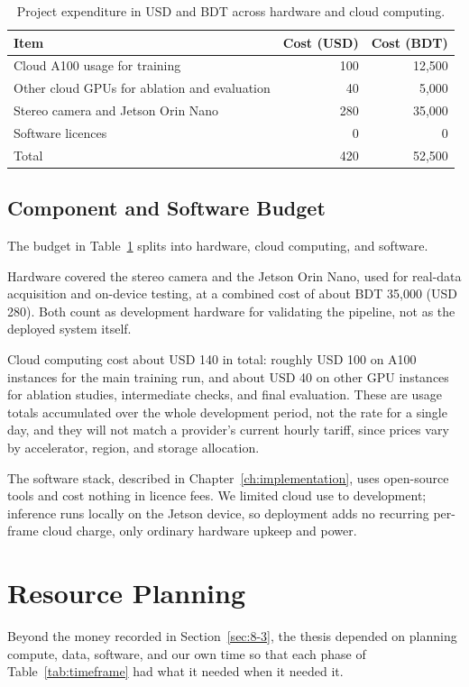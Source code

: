 \begin{table}[!htbp]
\centering
\caption{Project expenditure in USD and BDT across hardware and cloud computing.}
\label{tab:expenses}
\small
\begin{tabular}{p{8.4cm}rr}
\toprule
Item & Cost (USD) & Cost (BDT)\\
\midrule
Cloud A100 usage for training & 100 & 12,500\\
Other cloud GPUs for ablation and evaluation & 40 & 5,000\\
Stereo camera and Jetson Orin Nano & 280 & 35,000\\
Software licences & 0 & 0\\
\midrule
Total & 420 & 52,500\\
\bottomrule
\end{tabular}
\end{table}

\subsection{Component and Software Budget}
The budget in Table~\ref{tab:expenses} splits into hardware, cloud
computing, and software.

Hardware covered the stereo camera and the Jetson Orin Nano, used for
real-data acquisition and on-device testing, at a combined cost of
about BDT 35,000 (USD 280). Both count as development hardware for
validating the pipeline, not as the deployed system itself.

Cloud computing cost about USD 140 in total: roughly USD 100 on A100
instances for the main training run, and about USD 40 on other GPU
instances for ablation studies, intermediate checks, and final
evaluation. These are usage totals accumulated over the whole
development period, not the rate for a single day, and they will not
match a provider's current hourly tariff, since prices vary by
accelerator, region, and storage allocation.

The software stack, described in Chapter~\ref{ch:implementation}, uses
open-source tools and cost nothing in licence fees. We limited cloud
use to development; inference runs locally on the Jetson device, so
deployment adds no recurring per-frame cloud charge, only ordinary
hardware upkeep and power.

\FloatBarrier
\section{Resource Planning}
\label{sec:8-4}
Beyond the money recorded in Section~\ref{sec:8-3}, the thesis depended
on planning compute, data, software, and our own time so that each
phase of Table~\ref{tab:timeframe} had what it needed when it needed
it.

